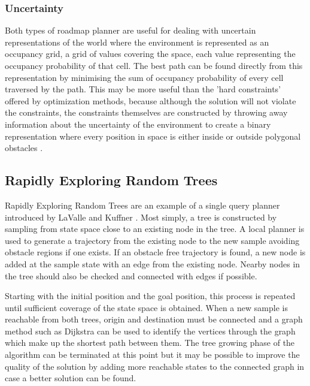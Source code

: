 \subsubsection{Uncertainty}
Both types of roadmap planner are useful for dealing with uncertain representations of the world where the environment is represented as an occupancy grid, a grid of values covering the space, each value representing the occupancy probability of that cell. The best path can be found directly from this representation by minimising the sum of occupancy probability of every cell traversed by the path. This may be more useful than the 'hard constraints' offered by optimization methods, because although the solution will not violate the constraints, the constraints themselves are constructed by throwing away information about the uncertainty of the environment to create a binary representation where every position in space is either inside or outside polygonal obstacles \cite{Pivtoraiko2009}.     

\subsection{Rapidly Exploring  Random Trees}
Rapidly Exploring Random Trees are an example of a single query planner introduced by LaValle and Kuffner \cite{LaValle2000}. Most simply, a tree is constructed by sampling from state space close to an existing node in the tree. A local planner is used to generate a trajectory from the existing node to the new sample avoiding obstacle regions if one exists. If an obstacle free trajectory is found, a new node is added at the sample state with an edge from the existing node. Nearby nodes in the tree should also be checked and connected with edges if possible. 

Starting with the initial position and the goal position, this process is repeated until sufficient coverage of the state space is obtained. When a new sample is reachable from both trees, origin and destination must be connected and a graph method such as Dijkstra can be used to identify the vertices through the graph which make up the shortest path between them. The tree growing phase of the algorithm can be terminated at this point but it may be possible to improve the quality of the solution by adding more reachable states to the connected graph in case  a better solution can be found.  
